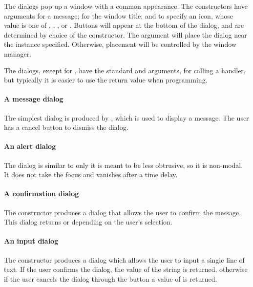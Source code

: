 The dialogs pop up a window with a common appearance. The
constructors have arguments  for a
message;  for the window title; and
 to specify an icon, whose value is one of
, , , or
. Buttons will appear at the bottom of the dialog,
and are determined by choice of the constructor. The
 argument will place the dialog near the
 instance specified. Otherwise, placement will be
controlled by the window manager.

The dialogs, except for , have the standard
 and  arguments, for calling a handler, but
typically it is easier to use the return value when programming.

\paragraph{A message dialog}
The simplest dialog is produced by , which is used to
display a message. The user has a cancel button to dismiss the dialog.

\paragraph{An alert dialog}
The  dialog is similar to  only it is meant
to be less obtrusive, so it is non-modal. It does not take the focus and vanishes after a time delay.

\paragraph{A confirmation dialog}
The constructor  produces a dialog that allows
the user to confirm the message. This dialog returns  or
 depending on the user's selection.


\paragraph{An input dialog}
The  constructor produces a dialog which allows
the user to input a single line of text. If the user confirms the
dialog, the value of the string is returned, otherwise if the user
cancels the dialog through the button a value of  is returned.




